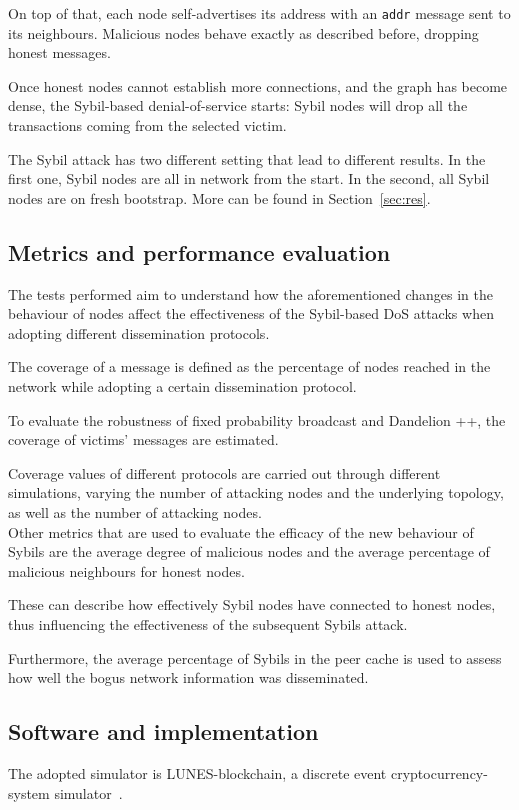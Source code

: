 \documentclass[12pt, letterpaper, twoside]{article}
\begin{document}
On top of that, each node self-advertises its address with an \texttt{addr} message sent to its neighbours. Malicious nodes behave exactly as described before, dropping honest messages.

Once honest nodes cannot establish more connections, and the graph has become dense, the Sybil-based denial-of-service starts: Sybil nodes will drop all the transactions coming from the selected victim. 

The Sybil attack has two different setting that lead to different results. In the first one, Sybil nodes are all in network from the start.  In the second, all Sybil nodes are on fresh bootstrap. More can be found in Section~\ref{sec:res}.

\subsection{Metrics and performance evaluation}\label{sec:metrics}
The tests performed aim to understand how the aforementioned changes in the behaviour of nodes affect the effectiveness of the Sybil-based DoS attacks when adopting different dissemination protocols.

The coverage of a message is defined as the percentage of nodes reached in the network while adopting a certain dissemination protocol.

To evaluate the robustness of fixed probability broadcast and Dandelion ++, the coverage of victims' messages are estimated.

Coverage values of different protocols are carried out through different simulations, varying the number of attacking nodes and the underlying topology, as well as the number of attacking nodes.\\

Other metrics that are used to evaluate the efficacy of the new behaviour of Sybils are the average degree of malicious nodes and the average percentage of malicious neighbours for honest nodes.

These can describe how effectively Sybil nodes have connected to honest nodes, thus influencing the effectiveness of the subsequent Sybils attack.

Furthermore, the average percentage of Sybils in the peer cache is used to assess how well the bogus network information was disseminated.


\subsection{Software and implementation}\label{sec:softw}
The adopted simulator is LUNES-blockchain, a discrete event cryptocurrency-system simulator~\cite{lunes-paper}.
\end{document}
